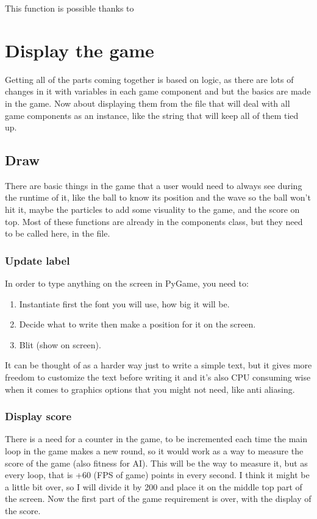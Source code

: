 This function is possible thanks to 

\section{Display the game}\label{display-the-game}
Getting all of the parts coming together is based on logic, as there are lots of changes in it with variables in each game component  and  but the basics are made in the game. Now about displaying them from the  file that will deal with all game components as an instance, like the string that will keep all of them tied up.

\subsection{Draw}\label{draw}
There are basic things in the game that a user would need to always see during the runtime of it, like the ball to know its position and the wave so the ball won't hit it, maybe the particles to add some visuality to the game, and the score on top. Most of these functions are already in the components class, but they need to be called here, in the  file.

\subsubsection{Update label}

In order to type anything on the screen in PyGame, you need to:
\begin{enumerate}
	\item Instantiate first the font you will use, how big it will be.
	\item Decide what to write then make a position for it on the screen.
	\item Blit (show on screen).
\end{enumerate}

It can be thought of as a harder way just to write a simple text, but it gives more freedom to customize the text before writing it and it's also CPU consuming wise when it comes to graphics options that you might not need, like anti aliasing.

\subsubsection{Display score} \label{display-score}
There is a need for a counter in the game, to be incremented each time the main  loop in the game makes a new round, so it would work as a way to measure the score of the game (also fitness for AI). This  will be the way to measure it, but as every loop, that is +60 (FPS of game) points in every second. I think it might be a little bit over, so I will divide it by 200 and place it on the middle top part of the screen. Now the first part of the game requirement is over, with the display of the score.

